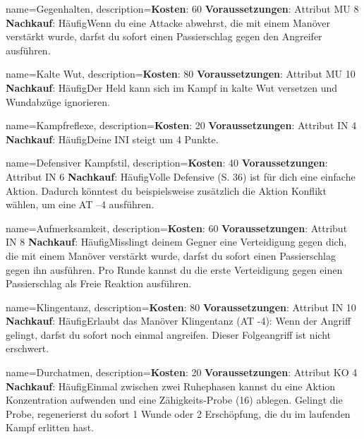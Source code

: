 {
    name={Gegenhalten},
    description={\textbf{Kosten}: 60 \textbf{Voraussetzungen}: Attribut MU 8 \textbf{Nachkauf}: Häufig\newline Wenn du eine Attacke abwehrst, die mit einem Manöver verstärkt wurde, darfst du sofort einen Passierschlag gegen den Angreifer ausführen.}
}


{
    name={Kalte Wut},
    description={\textbf{Kosten}: 80 \textbf{Voraussetzungen}: Attribut MU 10 \textbf{Nachkauf}: Häufig\newline Der Held kann sich im Kampf in kalte Wut versetzen und Wundabzüge ignorieren.}
}


{
    name={Kampfreflexe},
    description={\textbf{Kosten}: 20 \textbf{Voraussetzungen}: Attribut IN 4 \textbf{Nachkauf}: Häufig\newline Deine INI steigt um 4 Punkte.}
}


{
    name={Defensiver Kampfstil},
    description={\textbf{Kosten}: 40 \textbf{Voraussetzungen}: Attribut IN 6 \textbf{Nachkauf}: Häufig\newline Volle Defensive (S. 36) ist für dich eine einfache Aktion. Dadurch könntest du beispielsweise zusätzlich die Aktion Konflikt wählen, um eine AT –4 ausführen.}
}


{
    name={Aufmerksamkeit},
    description={\textbf{Kosten}: 60 \textbf{Voraussetzungen}: Attribut IN 8 \textbf{Nachkauf}: Häufig\newline Misslingt deinem Gegner eine Verteidigung gegen dich, die mit einem Manöver verstärkt wurde, darfst du sofort einen Passierschlag gegen ihn ausführen. Pro Runde kannst du die erste Verteidigung gegen einen Passierschlag als Freie Reaktion ausführen.}
}


{
    name={Klingentanz},
    description={\textbf{Kosten}: 80 \textbf{Voraussetzungen}: Attribut IN 10 \textbf{Nachkauf}: Häufig\newline Erlaubt das Manöver Klingentanz (AT -4): Wenn der Angriff gelingt, darfst du sofort noch einmal angreifen. Dieser Folgeangriff ist nicht erschwert.}
}


{
    name={Durchatmen},
    description={\textbf{Kosten}: 20 \textbf{Voraussetzungen}: Attribut KO 4 \textbf{Nachkauf}: Häufig\newline Einmal zwischen zwei Ruhephasen kannst du eine Aktion Konzentration aufwenden und eine Zähigkeits-Probe (16) ablegen. Gelingt die Probe, regenerierst du sofort 1 Wunde oder 2 Erschöpfung, die du im laufenden Kampf erlitten hast.}
}


